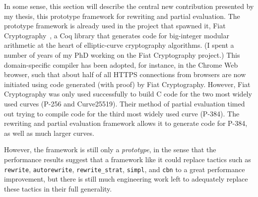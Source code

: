\documentclass[twoside]{article}
\begin{document}
In some sense, this section will describe the central new contribution presented by my thesis, this prototype framework for rewriting and partial evaluation.
The prototype framework is already used in the project that spawned it, Fiat Cryptography~\cite{FiatCryptoSP19}, a Coq library that generates code for big-integer modular arithmetic at the heart of elliptic-curve cryptography algorithms.
(I spent a number of years of my PhD working on the Fiat Cryptography project.)
This domain-specific compiler has been adopted, for instance, in the Chrome Web browser, such that about half of all HTTPS connections from browsers are now initiated using code generated (with proof) by Fiat Cryptography.
However, Fiat Cryptography was only used successfully to build C code for the two most widely used curves (P-256 and Curve25519).
Their method of partial evaluation timed out trying to compile code for the third most widely used curve (P-384).
The rewriting and partial evaluation framework allows it to generate code for P-384, as well as much larger curves.

However, the framework is still only a \emph{prototype}, in the sense that the performance results suggest that a framework like it could replace tactics such as \texttt{rewrite}, \texttt{autorewrite}, \texttt{rewrite\_strat}, \texttt{simpl}, and \texttt{cbn} to a great performance improvement, but there is still much engineering work left to adequately replace these tactics in their full generality.



\end{document}
